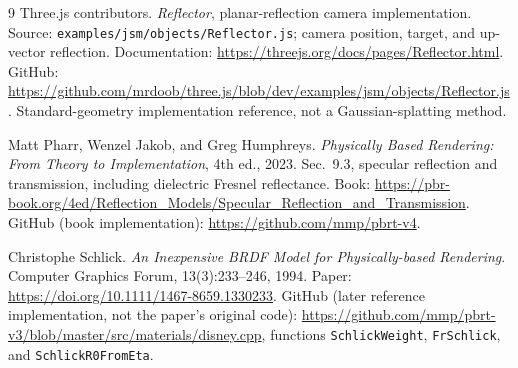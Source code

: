 \documentclass[10pt,a4paper]{article}
\begin{document}
\begin{thebibliography}{9}
Three.js contributors. \emph{Reflector}, planar-reflection camera implementation.
Source: \texttt{examples/jsm/objects/Reflector.js}; camera position, target, and up-vector reflection.
Documentation: \url{https://threejs.org/docs/pages/Reflector.html}.
GitHub: \url{https://github.com/mrdoob/three.js/blob/dev/examples/jsm/objects/Reflector.js}.
Standard-geometry implementation reference, not a Gaussian-splatting method.

Matt Pharr, Wenzel Jakob, and Greg Humphreys.
\emph{Physically Based Rendering: From Theory to Implementation}, 4th ed., 2023.
Sec.~9.3, specular reflection and transmission, including dielectric Fresnel reflectance.
Book: \url{https://pbr-book.org/4ed/Reflection_Models/Specular_Reflection_and_Transmission}.
GitHub (book implementation): \url{https://github.com/mmp/pbrt-v4}.

Christophe Schlick. \emph{An Inexpensive BRDF Model for Physically-based Rendering}.
Computer Graphics Forum, 13(3):233--246, 1994.
Paper: \url{https://doi.org/10.1111/1467-8659.1330233}.
GitHub (later reference implementation, not the paper's original code):
\url{https://github.com/mmp/pbrt-v3/blob/master/src/materials/disney.cpp},
functions \texttt{SchlickWeight}, \texttt{FrSchlick}, and \texttt{SchlickR0FromEta}.
\end{thebibliography}
\end{document}

